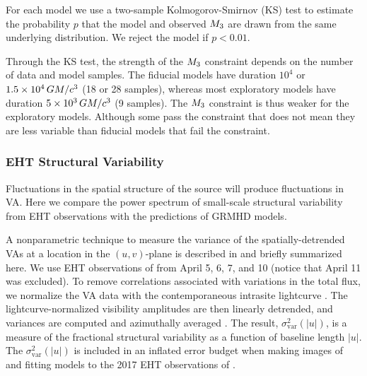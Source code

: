 For each model we use a two-sample Kolmogorov-Smirnov (KS) test to estimate the probability $p$ that the model and observed $M_{3}$ are drawn from the same underlying distribution.
We reject the model if $p < 0.01$.

Through the KS test, the strength of the $M_{3}$ constraint depends on the number of data and model samples.
The fiducial models have duration $10^4$ or $1.5\times 10^4\,GM/c^3$ (18 or 28 samples), whereas most exploratory models have duration $5 \times 10^3\,GM/c^3$ (9 samples).
The $M_{3}$ constraint is thus weaker for the exploratory models.
Although some pass the constraint that does not mean they are less variable than fiducial models that fail the constraint.

\subsubsection{EHT Structural Variability}

Fluctuations in the spatial structure of the source will produce fluctuations in VA.
Here we compare  the power spectrum of small-scale structural variability from EHT observations with the predictions of GRMHD models.

A nonparametric technique to measure the variance of the spatially-detrended VAs at a location in the $(u,v)$-plane is described in \citet{NoiseModeling} and briefly summarized here.
We use EHT observations of \sgra from April 5, 6, 7, and 10 (notice that April 11 was excluded).
To remove correlations associated with variations in the total flux, we normalize the VA data with the contemporaneous intrasite lightcurve \citep{Georgiev_2022}.
The lightcurve-normalized visibility amplitudes are then linearly detrended, and variances are computed and azimuthally averaged \citep{NoiseModeling}.
The result, $\sigma_\text{var}^2 (|u|)$, is a measure of the fractional structural variability as a function of baseline length $|u|$.
The $\sigma_\text{var}^2 (|u|)$ is included in an inflated error budget when making images of and fitting models to the 2017 EHT observations of \sgra {}.

